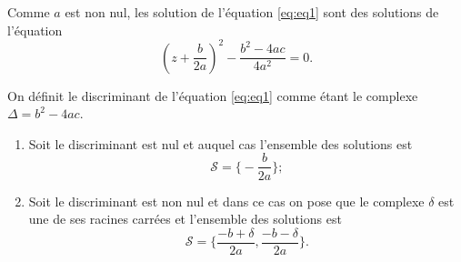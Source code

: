                         Comme \(a\) est non nul, les solution de l'équation \eqref{eq:eq1} sont des 
                        solutions de l'équation
                        \begin{equation}
                          \left( z + \frac{b}{2a} \right)^2 - \frac{b^2-4ac}{4a^2} = 0.
                        \end{equation}

                        \begin{defdef}
                          On définit le discriminant de l'équation \eqref{eq:eq1} comme étant le 
                          complexe \(\Delta = b^2-4ac\).
                        \end{defdef}

                        \begin{enumerate}
                          \item Soit le discriminant est nul et auquel cas l'ensemble des solutions 
                            est
                            \begin{equation}
                              \mathcal{S} = \biggl \lbrace-\frac{b}{2a} \biggl \rbrace;
                              \end{equation}
                            \item Soit le discriminant est non nul et dans ce cas on pose que le 
                              complexe \(\delta\) est une de ses racines carrées et l'ensemble des 
                              solutions est
                              \begin{equation}
                                \mathcal{S} = \biggl \lbrace \frac{-b + \delta}{2a} , 
                                  \frac{-b-\delta}{2a} \biggl \rbrace.
                                \end{equation}
                            \end{enumerate}

